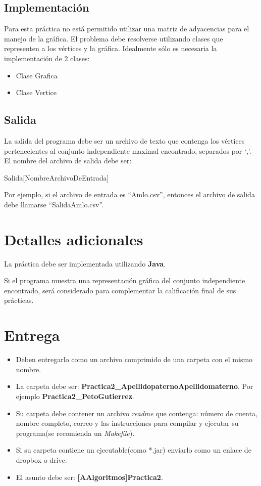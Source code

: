 \documentclass{article}
\begin{document}
\subsection{Implementación}

Para esta práctica no está permitido utilizar una matriz de adyacencias para el manejo de la gráfica. El problema debe resolverse utilizando clases que representen a los vértices y la gráfica. Idealmente sólo es necesaria la implementación de 2 clases:

\begin{itemize}
\item Clase Grafica
\item Clase Vertice
\end{itemize}

\subsection{Salida}

La salida del programa debe ser un archivo de texto que contenga los vértices pertenecientes al conjunto independiente maximal encontrado, separados por `,'. El nombre del archivo de salida debe ser:

Salida[NombreArchivoDeEntrada]

Por ejemplo, si el archivo de entrada es ``Amlo.csv'', entonces el archivo de salida debe llamarse ``SalidaAmlo.csv''.

\section{Detalles adicionales}

La práctica debe ser implementada utilizando \textbf{Java}.

Si el programa muestra una representación gráfica del conjunto independiente encontrado, será considerado para complementar la calificación final de sus prácticas.

\section{Entrega}

\begin{itemize}
\item Deben entregarlo como un archivo comprimido de una carpeta con el mismo nombre.
\item La carpeta debe ser: \textbf{Practica2\_ApellidopaternoApellidomaterno}. Por ejemplo \textbf{Practica2\_PetoGutierrez}.
\item Su carpeta debe contener un archivo \emph{readme} que contenga: número de cuenta, nombre completo, 
correo y las instrucciones para compilar y ejecutar su programa(se recomienda un \emph{Makefile}).
\item Si su carpeta contiene un ejecutable(como *.jar) enviarlo como un enlace de dropbox o drive.
\item El asunto debe ser: \textbf{[AAlgoritmos]Practica2}.
\end{itemize}
\end{document}

